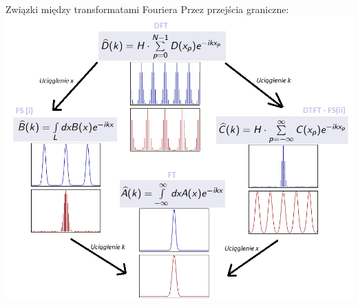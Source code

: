 \begin{frame}{Związki między transformatami Fouriera}
	Przez przejścia graniczne:\\
	\centering
	\includegraphics[height=0.8\textheight]{img/16/przejscia_graniczne.png}
\end{frame}
